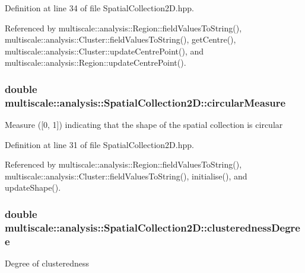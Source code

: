 Definition at line 34 of file Spatial\-Collection2\-D.\-hpp.



Referenced by multiscale\-::analysis\-::\-Region\-::field\-Values\-To\-String(), multiscale\-::analysis\-::\-Cluster\-::field\-Values\-To\-String(), get\-Centre(), multiscale\-::analysis\-::\-Cluster\-::update\-Centre\-Point(), and multiscale\-::analysis\-::\-Region\-::update\-Centre\-Point().

\hypertarget{classmultiscale_1_1analysis_1_1SpatialCollection2D_a4c58c82dd3d67d670b554bfaeb2b19ba}{
\subsubsection[{circular\-Measure}]{\setlength{\rightskip}{0pt plus 5cm}double multiscale\-::analysis\-::\-Spatial\-Collection2\-D\-::circular\-Measure\hspace{0.3cm}{\ttfamily [protected]}}}\label{classmultiscale_1_1analysis_1_1SpatialCollection2D_a4c58c82dd3d67d670b554bfaeb2b19ba}
Measure (\mbox{[}0, 1\mbox{]}) indicating that the shape of the spatial collection is circular 

Definition at line 31 of file Spatial\-Collection2\-D.\-hpp.



Referenced by multiscale\-::analysis\-::\-Region\-::field\-Values\-To\-String(), multiscale\-::analysis\-::\-Cluster\-::field\-Values\-To\-String(), initialise(), and update\-Shape().

\hypertarget{classmultiscale_1_1analysis_1_1SpatialCollection2D_acd11d0bbeb60a1168bd2c2fbbc6fe965}{
\subsubsection[{clusteredness\-Degree}]{\setlength{\rightskip}{0pt plus 5cm}double multiscale\-::analysis\-::\-Spatial\-Collection2\-D\-::clusteredness\-Degree\hspace{0.3cm}{\ttfamily [protected]}}}\label{classmultiscale_1_1analysis_1_1SpatialCollection2D_acd11d0bbeb60a1168bd2c2fbbc6fe965}
Degree of clusteredness 

